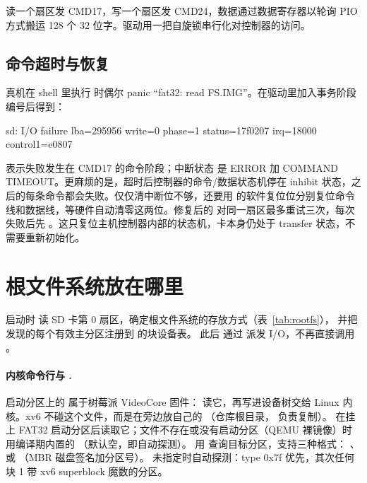 读一个扇区发 CMD17，写一个扇区发 CMD24，数据通过数据寄存器以轮询 PIO 方式搬运 128 个 32 位字。驱动用一把自旋锁串行化对控制器的访问。

\subsection{命令超时与恢复}

真机在 shell 里执行  时偶尔 panic “fat32: read FS.IMG”。在驱动里加入事务阶段编号后得到：

\begin{txtcode}
sd: I/O failure lba=295956 write=0 phase=1 status=17f0207 irq=18000 control1=e0807
\end{txtcode}

 表示失败发生在 CMD17 的命令阶段；中断状态  是 ERROR 加 COMMAND TIMEOUT。更麻烦的是，超时后控制器的命令/数据状态机停在 inhibit 状态，之后的每条命令都会失败。仅仅清中断位不够，还要用  的软件复位位分别复位命令线和数据线，等硬件自动清零这两位。修复后的  对同一扇区最多重试三次，每次失败后先 。这只复位主机控制器内部的状态机，卡本身仍处于 transfer 状态，不需要重新初始化。

\section{根文件系统放在哪里}
\label{sec:rootfs}

启动时  读 SD 卡第 0 扇区，确定根文件系统的存放方式（表~\ref{tab:rootfs}），
并把发现的每个有效主分区注册到  的块设备表。
此后  通过  派发 I/O，不再直接调用 。

\paragraph{内核命令行与 .} 启动分区上的  属于树莓派 VideoCore
固件： 读它，再写进设备树交给 Linux 内核。xv6 不碰这个文件，而是在旁边放自己的
（仓库根目录， 负责复制）。
在挂上 FAT32 启动分区后读取它；文件不存在或没有启动分区（QEMU 裸镜像）时用编译期内置的
（默认空，即自动探测）。
 用  查询目标分区，支持三种格式：
、 或 （MBR 磁盘签名加分区号）。
未指定时自动探测：type 0x7f 优先，其次任何块 1 带 xv6 superblock 魔数的分区。

